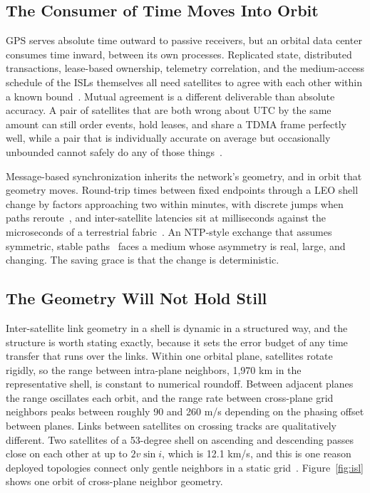 \documentclass[twocolumn,10pt]{article}
\begin{document}
\subsection{The Consumer of Time Moves Into Orbit}\label{sec:break-consumer}
GPS serves absolute time outward to passive receivers, but an orbital data center consumes time inward, between its own processes. Replicated state, distributed transactions, lease-based ownership, telemetry correlation, and the medium-access schedule of the ISLs themselves all need satellites to agree with each other within a known bound~\cite{corbett2012,liskov1991}. Mutual agreement is a different deliverable than absolute accuracy. A pair of satellites that are both wrong about UTC by the same amount can still order events, hold leases, and share a TDMA frame perfectly well, while a pair that is individually accurate on average but occasionally unbounded cannot safely do any of those things~\cite{li2020}.

Message-based synchronization inherits the network's geometry, and in orbit that geometry moves. Round-trip times between fixed endpoints through a LEO shell change by factors approaching two within minutes, with discrete jumps when paths reroute~\cite{kassing2020}, and inter-satellite latencies sit at milliseconds against the microseconds of a terrestrial fabric~\cite{bhattacherjee2020}. An NTP-style exchange that assumes symmetric, stable paths~\cite{mills1991} faces a medium whose asymmetry is real, large, and changing. The saving grace is that the change is deterministic.

\subsection{The Geometry Will Not Hold Still}\label{sec:break-geometry}
Inter-satellite link geometry in a shell is dynamic in a structured way, and the structure is worth stating exactly, because it sets the error budget of any time transfer that runs over the links. Within one orbital plane, satellites rotate rigidly, so the range between intra-plane neighbors, 1{,}970 km in the representative shell, is constant to numerical roundoff. Between adjacent planes the range oscillates each orbit, and the range rate between cross-plane grid neighbors peaks between roughly 90 and 260 m/s depending on the phasing offset between planes. Links between satellites on crossing tracks are qualitatively different. Two satellites of a 53-degree shell on ascending and descending passes close on each other at up to $2v\sin i$, which is 12.1 km/s, and this is one reason deployed topologies connect only gentle neighbors in a static grid~\cite{bhattacherjee2019,pfandzelter2023}. Figure~\ref{fig:isl} shows one orbit of cross-plane neighbor geometry.
\end{document}
